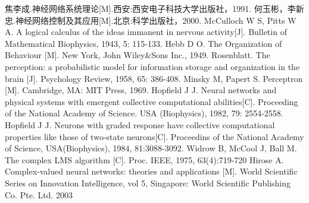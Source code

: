
\begin{thebibliography}{99}


 焦李成.神经网络系统理论[M].西安:西安电子科技大学出版社，1991.
 何玉彬，李新忠.神经网络控制及其应用[M].北京:科学出版社，2000.
 McCulloch W S, Pitts W A. A logical calculus of the ideas immanent in nervous activity[J]. Bulletin of Mathematical Biophysics, 1943, 5: 115-133.
 Hebb D O. The Organization of Behaviour [M]. New York, John Wiley\&Sons Inc., 1949.
 Rosenblatt. The perception: a probabilistic model for information storage and organization in the brain [J]. Psychology Review, 1958, 65: 386-408.
 Minsky M, Papert S. Perceptron [M]. Cambridge, MA: MIT Press, 1969.
 Hopf\/ield  J  J.  Neural  networks  and  physical  systems  with  emergent  collective computational  abilities[C].  Proceeding  of the National Academy  of  Science.  USA (Biophysics), 1982, 79: 2554-2558.
 Hopf\/ield J J. Neurons with graded response have collective computational properties like those  of  two-state  neurons[C].  Proceedins  of  the  National  Academy  of  Science, USA(Biophysics), 1984, 81:3088-3092.
 Widrow B, McCool J, Ball M. The complex LMS algorithm [C]. Proc. IEEE, 1975, 63(4):719-720
 Hirose  A.  Complex-valued  neural  networks:  theories  and  applications  [M].  World Scientif\/ic Series on Innovation Intelligence, vol 5, Singapore: World Scientif\/ic Publishing Co. Pte. Ltd. 2003


\end{thebibliography}
